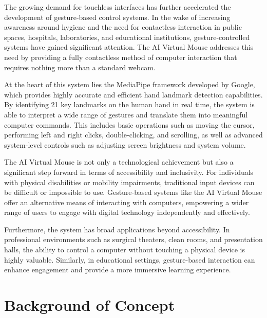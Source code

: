 \documentclass[12pt,a4paper]{report}
\begin{document}
The growing demand for touchless interfaces has further accelerated the development
of gesture-based control systems. In the wake of increasing awareness around hygiene
and the need for contactless interaction in public spaces, hospitals, laboratories, and
educational institutions, gesture-controlled systems have gained significant attention.
The AI Virtual Mouse addresses this need by providing a fully contactless method of
computer interaction that requires nothing more than a standard webcam.

At the heart of this system lies the MediaPipe framework developed by Google,
which provides highly accurate and efficient hand landmark detection capabilities. By
identifying 21 key landmarks on the human hand in real time, the system is able to
interpret a wide range of gestures and translate them into meaningful computer commands.
This includes basic operations such as moving the cursor, performing left and right
clicks, double-clicking, and scrolling, as well as advanced system-level controls such
as adjusting screen brightness and system volume.

The AI Virtual Mouse is not only a technological achievement but also a significant
step forward in terms of accessibility and inclusivity. For individuals with physical
disabilities or mobility impairments, traditional input devices can be difficult or
impossible to use. Gesture-based systems like the AI Virtual Mouse offer an alternative
means of interacting with computers, empowering a wider range of users to engage with
digital technology independently and effectively.

Furthermore, the system has broad applications beyond accessibility. In professional
environments such as surgical theaters, clean rooms, and presentation halls, the ability
to control a computer without touching a physical device is highly valuable. Similarly,
in educational settings, gesture-based interaction can enhance engagement and provide
a more immersive learning experience.



\section{Background of Concept}
\end{document}
